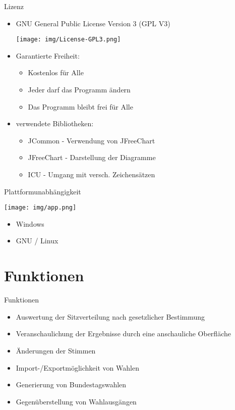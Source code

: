 \documentclass[18pt]{beamer}
\begin{document}
\begin{frame}{Lizenz}
\begin{itemize}
	\item GNU General Public License Version 3 (GPL V3)
	\begin{center}
		\texttt{[image: img/License-GPL3.png]}
	\end{center}
	\item Garantierte Freiheit:
	\begin{itemize}
		\item Kostenlos für Alle
		\item Jeder darf das Programm ändern
		\item Das Programm bleibt frei für Alle
	\end{itemize}

	\item verwendete Bibliotheken:
	\begin{itemize}
		\item JCommon - Verwendung von JFreeChart
		\item JFreeChart - Darstellung der Diagramme
		\item ICU - Umgang mit versch. Zeichensätzen
	\end{itemize}
\end{itemize}
\end{frame}

\begin{frame}{Plattformunabhängigkeit}
\begin{center}
	\texttt{[image: img/app.png]}
\end{center}
\begin{itemize}
	\item Windows
	\item GNU / Linux
\end{itemize}
\end{frame}

\section{Funktionen}
\begin{frame}{Funktionen}
\begin{itemize}
	\item Auswertung der Sitzverteilung nach gesetzlicher Bestimmung
	\item Veranschaulichung der Ergebnisse durch eine anschauliche Oberfläche
		\item Änderungen der Stimmen
	\item Import-/Exportmöglichkeit von Wahlen
	\item Generierung von Bundestagswahlen
	\item Gegenüberstellung von Wahlausgängen
\end{itemize}
\end{frame}
\end{document}
